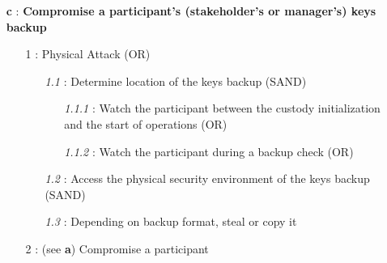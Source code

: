 \documentclass[runningheads]{llncs}
\begin{document}
{\footnotesize
\begin{itemize}[noitemsep,parsep=0pt,partopsep=0pt, leftmargin=0.7cm]
\item[\textbf{c} :] \textbf{Compromise a participant’s (stakeholder's or manager's) keys backup}
\begin{itemize}[noitemsep,topsep=0pt,parsep=0pt,partopsep=0pt, leftmargin=0.9cm]
\item[1 :] Physical Attack (OR)
\begin{itemize}[noitemsep,topsep=0pt,parsep=0pt,partopsep=0pt, leftmargin=0.9cm]
\item[\textit{1.1} :] Determine location of the keys backup (SAND)
\begin{itemize}[noitemsep,topsep=0pt,parsep=0pt,partopsep=0pt, leftmargin=1cm]
\item[\textit{1.1.1} :] Watch the participant between the custody initialization and the start of operations (OR)
\item[\textit{1.1.2} :] Watch the participant during a backup check (OR)
\end{itemize}
\item[\textit{1.2} :] Access the physical security environment of the keys backup (SAND)
\item[\textit{1.3} :] Depending on backup format, steal or copy it
\end{itemize}
\item[2 :] (see \textbf{a}) Compromise a participant
\end{itemize}
\end{itemize}
}
\end{document}

